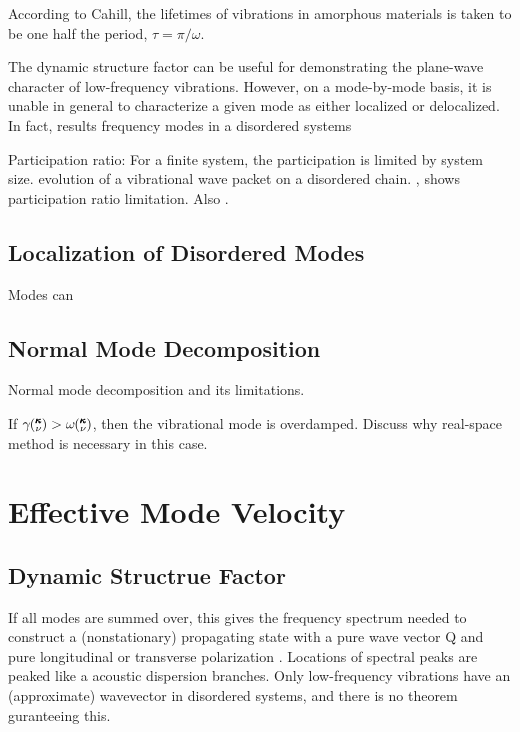 \documentclass[aps,prb,preprint,superscriptaddress,amsmath,amssymb,floatfix]{revtex4}
\newcommand{\kv}{\mspace{-4.0mu}\left(\mspace{-8.0mu}
\begin{smallmatrix}&\pmb{\kappa} \\&\nu\end{smallmatrix}
\mspace{-3.0mu}\right)}
\begin{document}
According to Cahill, the lifetimes of vibrations in amorphous materials 
is taken to be one half the period, $\tau = \pi/\omega $.
\cite{cahill_heat_1989}

The dynamic structure factor can be useful for demonstrating the 
plane-wave character of low-frequency vibrations.  However, on a 
mode-by-mode basis, it is unable in general to characterize a given mode 
as either localized or delocalized.  In fact, results   
frequency modes in a disordered systems

Participation ratio:
For a finite system, the participation is limited by system size.
evolution of a vibrational wave packet on a disordered chain.
\cite{allen_evolution_1998}, shows participation ratio limitation. Also 
\cite{garber_numerical_2001}.


\subsection{\label{S:Lifetimes:}Localization of Disordered Modes}
Modes can







\subsection{\label{S:Lifetimes:}Normal Mode Decomposition}
Normal mode decomposition and its limitations.
\cite{turney_predicting_2009-1} 

If $\gamma \kv > \omega \kv$, then the vibrational mode is overdamped.  
Discuss why real-space method is necessary in this case.





\section{\label{S:GroupVeloctiy}Effective Mode Velocity}

\subsection{\label{S:Lifetimes:}Dynamic Structrue Factor}

If all modes are summed over, this gives the frequency spectrum
needed to construct a (nonstationary) propagating state with a
pure wave vector Q and pure longitudinal or transverse polarization
 \cite{feldman_thermal_1993}. Locations of spectral peaks are peaked 
like a acoustic dispersion branches. Only low-frequency vibrations 
have an (approximate) wavevector in disordered systems, and there is 
no theorem guranteeing this. \cite{feldman_numerical_1999}
\end{document}
